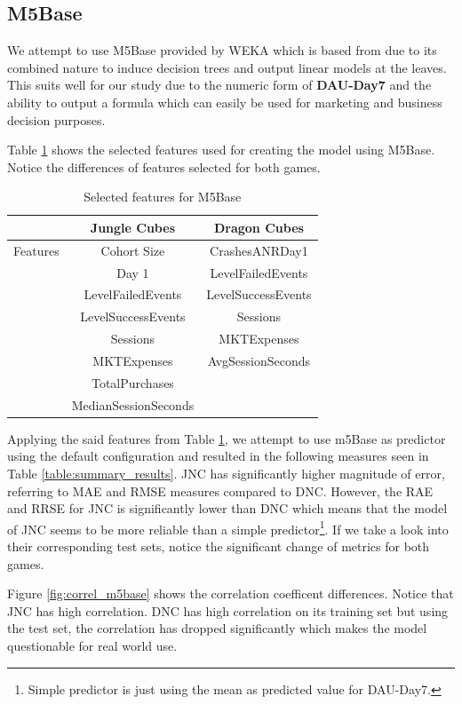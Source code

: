 \subsection{M5Base}
We attempt to use M5Base provided by WEKA which is based from \cite{ref:m5base} due to its combined nature to induce decision trees and output linear models at the leaves. This suits well for our study due to the numeric form of \textbf{DAU-Day7} and the ability to output a formula which can easily be used for marketing and business decision purposes.

Table \ref{table:m5base_features} shows the selected features used for creating the model using M5Base. Notice the differences of features selected for both games.
\begin{table}[h]
\centering
\caption{Selected features for M5Base}
\label{table:m5base_features}
\begin{tabular}{|c|c|c|}
\hline 
 & Jungle Cubes & Dragon Cubes\\ 
\hline 
Features & Cohort Size & CrashesANRDay1 
\\& Day 1 & LevelFailedEvents 
\\& LevelFailedEvents & LevelSuccessEvents
\\& LevelSuccessEvents & Sessions
\\& Sessions & MKTExpenses 
\\& MKTExpenses & AvgSessionSeconds 
\\& TotalPurchases & 
\\& MedianSessionSeconds &\\ 
\hline 

\end{tabular}
\end{table} 

Applying the said features from Table \ref{table:m5base_features}, we attempt to use m5Base as predictor using the default configuration and resulted in the following measures seen in Table \ref{table:summary_results}. JNC has significantly higher magnitude of error, referring to MAE and RMSE measures compared to DNC. However, the RAE and RRSE for JNC is significantly lower than DNC which means that the model of JNC seems to be more reliable than a simple predictor\footnote{Simple predictor is just using the mean as predicted value for DAU-Day7.}. If we take a look into their corresponding test sets, notice the significant change of metrics for both games.


Figure \ref{fig:correl_m5base} shows the correlation coefficent differences. Notice that JNC has high correlation. DNC has high correlation on its training set but using the test set, the correlation has dropped significantly which makes the model questionable for real world use.

